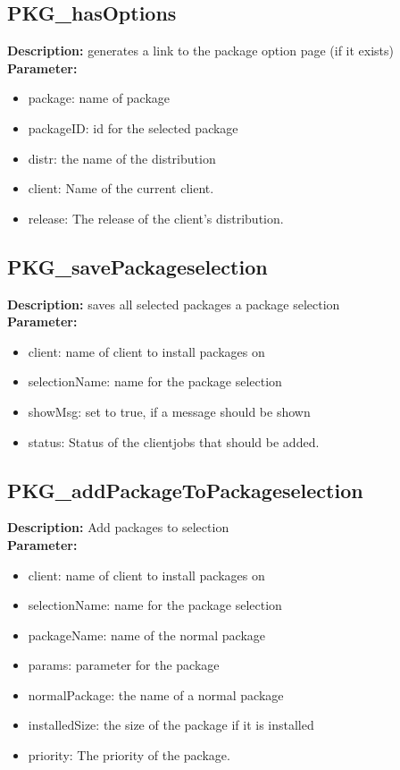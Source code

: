 \subsection{PKG\_hasOptions}
\textbf{Description:} generates a link to the package option page (if it exists)\\
\textbf{Parameter:}
\begin{itemize}
\item package: name of package
\item packageID: id for the selected package
\item distr: the name of the distribution
\item client: Name of the current client.
\item release: The release of the client's distribution.
\end{itemize}

\subsection{PKG\_savePackageselection}
\textbf{Description:} saves all selected packages a package selection\\
\textbf{Parameter:}
\begin{itemize}
\item client: name of client to install packages on
\item selectionName: name for the package selection
\item showMsg: set to true, if a message should be shown
\item status: Status of the clientjobs that should be added.
\end{itemize}

\subsection{PKG\_addPackageToPackageselection}
\textbf{Description:} Add packages to selection\\
\textbf{Parameter:}
\begin{itemize}
\item client: name of client to install packages on
\item selectionName: name for the package selection
\item packageName: name of the normal package
\item params: parameter for the package
\item normalPackage: the name of a normal package
\item installedSize: the size of the package if it is installed
\item priority: The priority of the package.
\end{itemize}

